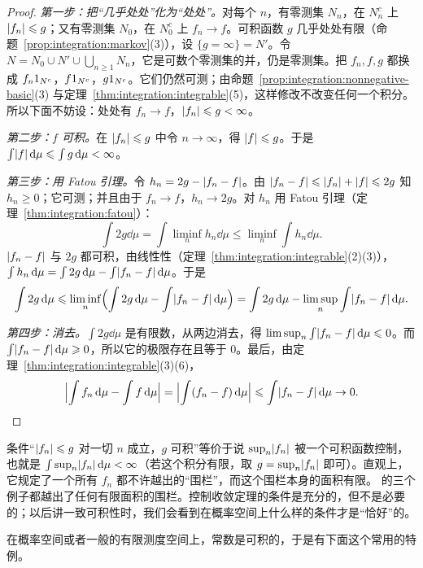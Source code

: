 \begin{proof}
\emph{第一步：把“几乎处处”化为“处处”。}对每个 $n$，有零测集 $N_n$，在 $N_n^c$ 上 $\lvert f_n\rvert\leqslant g$；又有零测集 $N_0$，在 $N_0^c$ 上 $f_n\to f$。可积函数 $g$ 几乎处处有限（命题~\ref{prop:integration:markov}(3)），设 $\{g=\infty\}=N'$。令 $N=N_0\cup N'\cup\bigcup_{n\geqslant1}N_n$，它是可数个零测集的并，仍是零测集。把 $f_n,f,g$ 都换成 $f_n1_{N^c}$，$f1_{N^c}$，$g1_{N^c}$。它们仍然可测；由命题~\ref{prop:integration:nonnegative-basic}(3) 与定理~\ref{thm:integration:integrable}(5)，这样修改不改变任何一个积分。所以下面不妨设：处处有 $f_n\to f$，$\lvert f_n\rvert\leqslant g<\infty$。

\emph{第二步：$f$ 可积。}在 $\lvert f_n\rvert\leqslant g$ 中令 $n\to\infty$，得 $\lvert f\rvert\leqslant g$。于是 $\int\lvert f\rvert\,\mathrm{d}\mu\leqslant\int g\,\mathrm{d}\mu<\infty$。

\emph{第三步：用 Fatou 引理。}令 $h_n=2g-\lvert f_n-f\rvert$。由 $\lvert f_n-f\rvert\leqslant\lvert f_n\rvert+\lvert f\rvert\leqslant2g$ 知 $h_n\geqslant0$；它可测；并且由于 $f_n\to f$，$h_n\to2g$。对 $h_n$ 用 Fatou 引理（定理~\ref{thm:integration:fatou}）：
\[
\int2g\dd\mu=\int\liminf_nh_n\dd\mu\leqslant\liminf_n\int h_n\dd\mu .
\]
$\lvert f_n-f\rvert$ 与 $2g$ 都可积，由线性性（定理~\ref{thm:integration:integrable}(2)(3)），$\int h_n\,\mathrm{d}\mu=\int2g\,\mathrm{d}\mu-\int\lvert f_n-f\rvert\,\mathrm{d}\mu$。于是
\[
\int2g\,\mathrm{d}\mu\leqslant\liminf_n\Bigl(\int2g\,\mathrm{d}\mu-\int\lvert f_n-f\rvert\,\mathrm{d}\mu\Bigr)=\int2g\,\mathrm{d}\mu-\limsup_n\int\lvert f_n-f\rvert\,\mathrm{d}\mu .
\]

\emph{第四步：消去。}$\int2g\dd\mu$ 是有限数，从两边消去，得 $\limsup_n\int\lvert f_n-f\rvert\,\mathrm{d}\mu\leqslant0$。而 $\int\lvert f_n-f\rvert\,\mathrm{d}\mu\geqslant0$，所以它的极限存在且等于 $0$。最后，由定理~\ref{thm:integration:integrable}(3)(6)，
\[
\Bigl\lvert\int f_n\,\mathrm{d}\mu-\int f\,\mathrm{d}\mu\Bigr\rvert=\Bigl\lvert\int(f_n-f)\,\mathrm{d}\mu\Bigr\rvert\leqslant\int\lvert f_n-f\rvert\,\mathrm{d}\mu\to0 .\qedhere
\]
\end{proof}

\begin{remark}[控制函数的含义]
条件“$\lvert f_n\rvert\leqslant g$ 对一切 $n$ 成立，$g$ 可积”等价于说 $\sup_n\lvert f_n\rvert$ 被一个可积函数控制，也就是 $\int\sup_n\lvert f_n\rvert\,\mathrm{d}\mu<\infty$（若这个积分有限，取 $g=\sup_n\lvert f_n\rvert$ 即可）。直观上，它规定了一个所有 $f_n$ 都不许越出的“围栏”，而这个围栏本身的面积有限。 的三个例子都越出了任何有限面积的围栏。控制收敛定理的条件是充分的，但不是必要的；以后讲一致可积性时，我们会看到在概率空间上什么样的条件才是“恰好”的。
\end{remark}

在概率空间或者一般的有限测度空间上，常数是可积的，于是有下面这个常用的特例。

